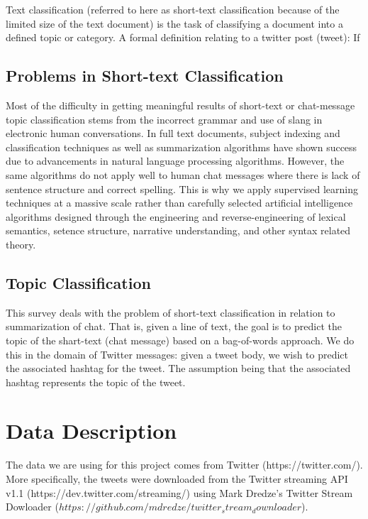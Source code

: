 \documentclass[11pt,letterpaper]{article}
\begin{document}
  Text classification (referred to here as short-text classification because of the limited size of the text document) is the task of classifying a document into a defined topic or category. A formal definition relating to a twitter post (tweet): If 
  
\subsection{Problems in Short-text Classification}
  Most of the difficulty in getting meaningful results of short-text or chat-message topic classification stems from the incorrect grammar and use of slang in electronic human conversations. In full text documents, subject indexing and classification techniques as well as summarization algorithms have shown success due to advancements in natural language processing algorithms. However, the same algorithms do not apply well to human chat messages where there is lack of sentence structure and correct spelling.
  This is why we apply supervised learning techniques at a massive scale rather than carefully selected artificial intelligence algorithms designed through the engineering and reverse-engineering of lexical semantics, setence structure, narrative understanding, and other syntax related theory.

\subsection{Topic Classification}
  This survey deals with the problem of short-text classification in relation to summarization of chat. That is, given a line of text, the goal is to predict the topic of the shart-text (chat message) based on a bag-of-words approach. We do this in the domain of Twitter messages: given a tweet body, we wish to predict the associated hashtag for the tweet. The assumption being that the associated hashtag represents the topic of the tweet.
  


\section{Data Description}
 The data we are using for this project comes from Twitter (https://twitter.com/). More specifically, the tweets were downloaded from the Twitter streaming API v1.1 (https://dev.twitter.com/streaming/) using Mark Dredze's Twitter Stream Dowloader ($https://github.com/mdredze/twitter_stream_downloader$).
 
\end{document}
